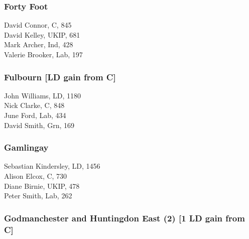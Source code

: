 \documentclass[a4paper,openany,10pt]{book}
\begin{document}
\subsubsection*{Forty Foot}



David Connor, C, 845\\
David Kelley, UKIP, 681\\
Mark Archer, Ind, 428\\
Valerie Brooker, Lab, 197\\


\subsubsection*{Fulbourn \hspace*{\fill}\nolinebreak[1]%
\enspace\hspace*{\fill}
[LD gain from C]}



John Williams, LD, 1180\\
Nick Clarke, C, 848\\
June Ford, Lab, 434\\
David Smith, Grn, 169\\


\subsubsection*{Gamlingay}



Sebastian Kindersley, LD, 1456\\
Alison Elcox, C, 730\\
Diane Birnie, UKIP, 478\\
Peter Smith, Lab, 262\\


\subsubsection*{Godmanchester and Huntingdon East (2) \hspace*{\fill}\nolinebreak[1]%
\enspace\hspace*{\fill}
[1 LD gain from C]}

\end{document}
